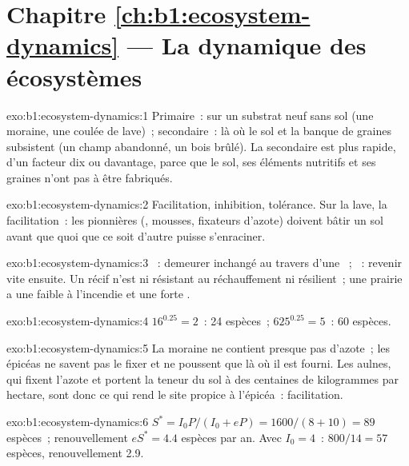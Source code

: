 \section*{Chapitre \ref{ch:b1:ecosystem-dynamics} --- La dynamique des écosystèmes}

\begin{solution}{exo:b1:ecosystem-dynamics:1}
Primaire~: sur un substrat neuf sans sol (une moraine, une coulée de
lave)~; secondaire~: là où le sol et la banque de graines subsistent (un
champ abandonné, un bois brûlé). La secondaire est plus rapide, d'un
facteur dix ou davantage, parce que le sol, ses éléments nutritifs et
ses graines n'ont pas à être fabriqués.
\end{solution}

\begin{solution}{exo:b1:ecosystem-dynamics:2}
Facilitation, inhibition, tolérance. Sur la lave, la facilitation~: les
pionnières (, mousses, fixateurs d'azote) doivent bâtir un sol
avant que quoi que ce soit d'autre puisse s'enraciner.
\end{solution}

\begin{solution}{exo:b1:ecosystem-dynamics:3}
~: demeurer inchangé au travers d'une ~;
~: revenir vite ensuite. Un récif n'est ni résistant au
réchauffement ni résilient~; une prairie a une faible  à
l'incendie et une forte .
\end{solution}

\begin{solution}{exo:b1:ecosystem-dynamics:4}
$16^{0.25} = 2$~: \num{24} espèces~; $625^{0.25} = 5$~: \num{60} espèces.
\end{solution}

\begin{solution}{exo:b1:ecosystem-dynamics:5}
La moraine ne contient presque pas d'azote~; les épicéas ne savent pas
le fixer et ne poussent que là où il est fourni. Les aulnes, qui fixent
l'azote et portent la teneur du sol à des centaines de kilogrammes par
hectare, sont donc ce qui rend le site propice à l'épicéa~:
facilitation.
\end{solution}

\begin{solution}{exo:b1:ecosystem-dynamics:6}
$S^* = I_0 P/(I_0 + eP) = 1600/(8 + 10) = 89$ espèces~; renouvellement
$eS^* = 4.4$ espèces par an. Avec $I_0 = 4$~: $800/14 = 57$ espèces,
renouvellement \num{2.9}.
\end{solution}

